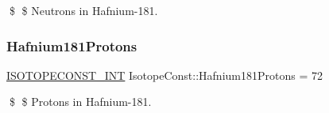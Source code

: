 \$ \$ Neutrons in Hafnium-\/181. \mbox{\label{group___isotope_const-_hafnium-_hf181_ga6b91facb261c9c8ac39db231a97ea1fc}} 
\subsubsection{\texorpdfstring{Hafnium181\+Protons}{Hafnium181Protons}}
{\footnotesize\ttfamily \mbox{\hyperlink{group___isotope_const-_macros_ga5f18360b3e99483a35c32d789e62621c}{I\+S\+O\+T\+O\+P\+E\+C\+O\+N\+S\+T\+\_\+\+I\+NT}} Isotope\+Const\+::\+Hafnium181\+Protons = 72}

\$ \$ Protons in Hafnium-\/181. 